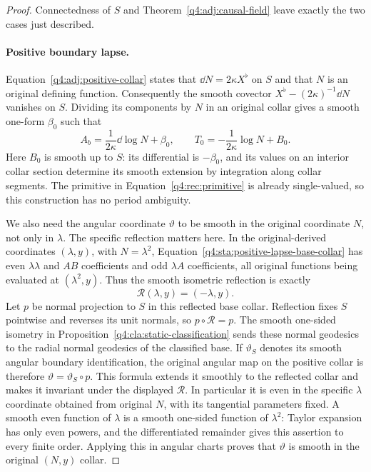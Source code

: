 \begin{proof}
Connectedness of $S$ and Theorem~\ref{q4:adj:causal-field} leave exactly the two
cases just described.

\paragraph{Positive boundary lapse.}
Equation~\eqref{q4:adj:positive-collar} states that
$\dd N=2\kappa X^\flat$ on $S$ and that $N$ is an original defining function.
Consequently the smooth covector
$X^\flat-(2\kappa)^{-1}\dd N$ vanishes on $S$.  Dividing its components by $N$
in an original collar gives a smooth one-form $\beta_0$ such that
\begin{equation}
 A_b=\frac1{2\kappa}\dd\log N+\beta_0,\qquad
 T_0=-\frac1{2\kappa}\log N+B_0.
 \label{q4:rec:log-time}
\end{equation}
Here $B_0$ is smooth up to $S$: its differential is $-\beta_0$, and its values
on an interior collar section determine its smooth extension by integration
along collar segments.  The primitive in
Equation~\eqref{q4:rec:primitive} is already single-valued, so this construction
has no period ambiguity.

We also need the angular coordinate $\vartheta$ to be smooth in the original
coordinate $N$, not only in $\lambda$.  The specific reflection matters here.
In the original-derived coordinates $(\lambda,y)$, with $N=\lambda^2$,
Equation~\eqref{q4:sta:positive-lapse-base-collar} has even $\lambda\lambda$ and
$AB$ coefficients and odd $\lambda A$ coefficients, all original functions
being evaluated at $(\lambda^2,y)$.  Thus the smooth isometric reflection is
exactly
\[
 \mathcal R(\lambda,y)=(-\lambda,y).
\]
Let $p$ be normal projection to $S$ in this reflected base collar.
Reflection fixes $S$ pointwise and reverses its unit normals, so
$p\circ\mathcal R=p$.  The smooth one-sided isometry in
Proposition~\ref{q4:cla:static-classification} sends these normal geodesics to
the radial normal geodesics of the classified base.  If $\vartheta_S$ denotes
its smooth angular boundary identification, the original angular map on the
positive collar is therefore $\vartheta=\vartheta_S\circ p$.  This formula
extends it smoothly to the reflected collar and makes it invariant under
the displayed $\mathcal R$.  In particular it is even in the specific
$\lambda$ coordinate obtained from original $N$, with its tangential
parameters fixed.  A smooth even function of
$\lambda$ is a smooth one-sided function of $\lambda^2$: Taylor expansion
has only even powers, and the differentiated remainder gives this assertion
to every finite order.  Applying this in angular charts proves that
$\vartheta$ is smooth in the original $(N,y)$ collar.


\end{proof}

